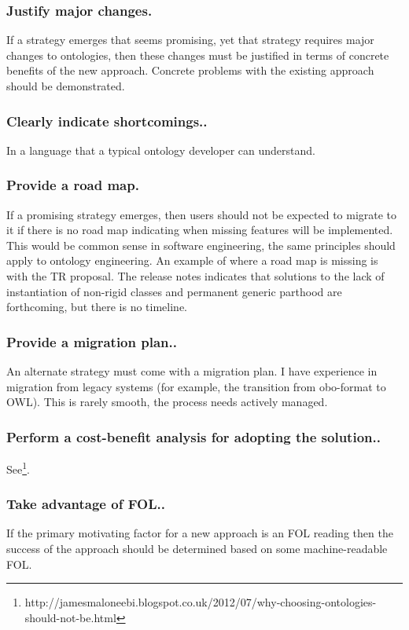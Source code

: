 \documentclass{bioinfo}
\begin{document}
\subsubsection{Justify major changes.} If a strategy emerges that
seems promising, yet that strategy requires major changes to
ontologies, then these changes must be justified in terms of concrete
benefits of the new approach. Concrete problems with the existing
approach should be demonstrated.

\subsubsection{Clearly indicate shortcomings..} In a language that a
typical ontology developer can understand.

\subsubsection{Provide a road map.} If a promising strategy emerges,
then users should not be expected to migrate to it if there is no road
map indicating when missing features will be implemented. This would
be common sense in software engineering, the same principles should
apply to ontology engineering.  An example of where a road map is
missing is with the TR proposal. The release notes indicates that
solutions to the lack of instantiation of non-rigid classes and
permanent generic parthood are forthcoming, but there is no timeline.

\subsubsection{Provide a migration plan..} An alternate strategy must
come with a migration plan. I have experience in migration from legacy
systems (for example, the transition from obo-format to OWL). This is
rarely smooth, the process needs actively managed.

\subsubsection{Perform a cost-benefit analysis for adopting the
  solution..}
See\footnote{http://jamesmaloneebi.blogspot.co.uk/2012/07/why-choosing-ontologies-should-not-be.html}.


\subsubsection{Take advantage of FOL..} If the primary motivating
factor for a new approach is an FOL reading then the success of the
approach should be determined based on some machine-readable FOL.
\end{document}
